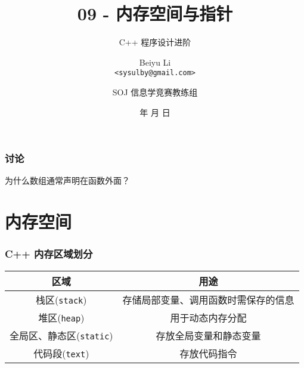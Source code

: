 \title[09 - 内存空间与指针]
{09 - 内存空间与指针}

\subtitle{C++ 程序设计进阶}

\author[Beiyu Li]
{Beiyu Li\\
\texttt{<sysulby@gmail.com>}}


\date[\today]
{\number\year 年 \number\month 月 \number\day 日}




\author[sysulby]
{SOJ 信息学竞赛教练组}

\begin{frame}
    \titlepage
\end{frame}
\setcounter{framenumber}{0} %

\begin{frame}[fragile]
    \frametitle{讨论}

    \begin{block}{}
        \vspace{.5cm}
        \begin{center}
            {\Large 为什么数组通常声明在函数外面？}
        \end{center}
        \vspace{.5cm}
    \end{block}
\end{frame}

\section{内存空间}

\begin{frame}[fragile]
    \frametitle{C++ 内存区域划分}

    \begin{table}[!ht]
        \centering
        \renewcommand{\arraystretch}{1.5} %
        \begin{tabular}{cc}
            \toprule
            \textbf{区域}  & \textbf{用途} \\
            \midrule
            栈区(\lstinline|stack|)  & 存储局部变量、调用函数时需保存的信息 \\ 
            堆区(\lstinline|heap|)   & 用于动态内存分配 \\ 
            全局区、静态区(\lstinline|static|)   & 存放全局变量和静态变量 \\ 
            代码段(\lstinline|text|)  & 存放代码指令 \\
            \bottomrule
        \end{tabular} 
    \end{table}

\end{frame}

